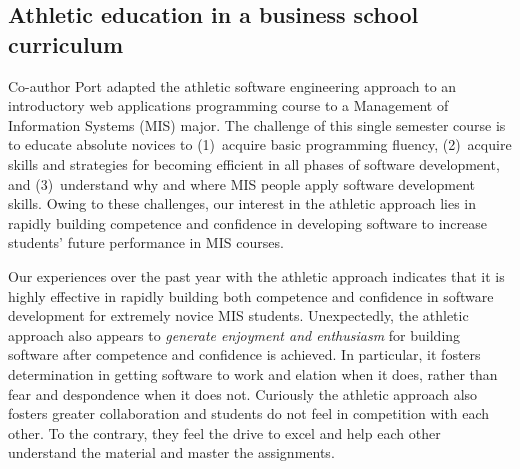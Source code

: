 \subsection{Athletic education in a business school curriculum}

Co-author Port adapted the athletic software engineering approach to an introductory web applications programming course to a Management of Information Systems (MIS) major. %
%
The challenge of this single semester course is to educate absolute novices to (1)~acquire basic programming fluency, (2)~acquire skills and strategies for becoming efficient in all phases of software development, and (3)~understand why and where MIS people apply software development skills.
%
%
Owing to these challenges, our interest in the athletic approach lies in rapidly building competence and confidence in developing software to increase students' future performance in MIS courses.


Our experiences over the past year with the athletic approach indicates that it is highly effective in rapidly building both competence and confidence in software development for extremely novice MIS students. Unexpectedly, the athletic approach also appears to {\em generate enjoyment and enthusiasm} for building software after competence and confidence is achieved. In particular, it fosters determination in getting software to work and elation when it does, rather than fear and despondence when it does not. Curiously the athletic approach also fosters greater collaboration and students do not feel in competition with each other. To the contrary, they feel the drive to excel and help each other understand the material and master the assignments.
    
